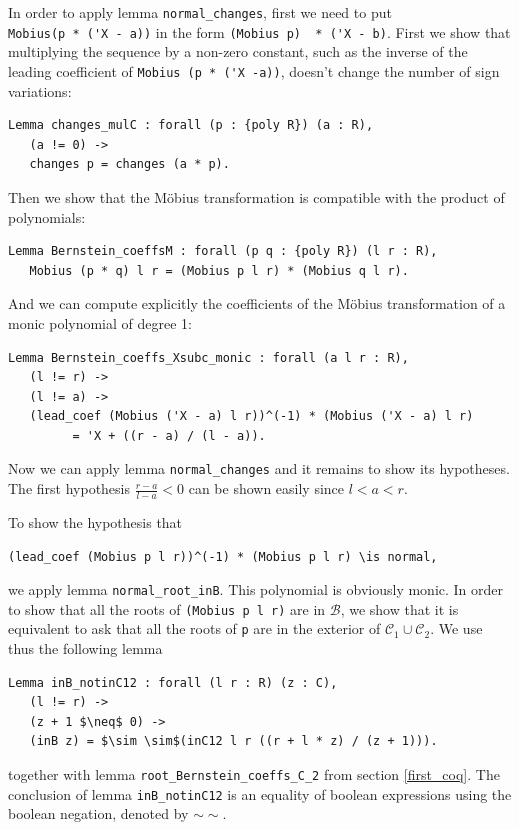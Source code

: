 \documentclass[11pt, a4paper]{article}
\newcommand{\ssb}{{\mathcal B}}
\newcommand{\ssc}{{\mathcal C}}
\begin{document}
In order to apply lemma \lstinline!normal_changes!, first we need to put\\ \lstinline!Mobius(p * ('X - a))! in the form \lstinline!(Mobius p)  * ('X - b)!.
First we show that multiplying the sequence by a non-zero constant, such as the inverse of the leading coefficient of \lstinline!Mobius (p * ('X -a))!, doesn't change the number of sign variations:
\begin{lstlisting}
Lemma changes_mulC : forall (p : {poly R}) (a : R),
   (a != 0) ->
   changes p = changes (a * p).
\end{lstlisting}
Then we show that the M\"obius transformation is compatible with the product of polynomials:
\begin{lstlisting}
Lemma Bernstein_coeffsM : forall (p q : {poly R}) (l r : R),
   Mobius (p * q) l r = (Mobius p l r) * (Mobius q l r).
\end{lstlisting}
And we can compute explicitly the coefficients of the M\"obius transformation of a monic polynomial of degree 1:
\begin{lstlisting}
Lemma Bernstein_coeffs_Xsubc_monic : forall (a l r : R),
   (l != r) ->
   (l != a) ->
   (lead_coef (Mobius ('X - a) l r))^(-1) * (Mobius ('X - a) l r) 
         = 'X + ((r - a) / (l - a)).
\end{lstlisting}
Now we can apply lemma \lstinline!normal_changes! and it remains to show its hypotheses.
The first hypothesis $\frac{r-a}{l-a} < 0$ can be shown easily since $l < a <r$.

To show the hypothesis that 
\begin{lstlisting}
(lead_coef (Mobius p l r))^(-1) * (Mobius p l r) \is normal,
\end{lstlisting}
 we apply lemma \lstinline!normal_root_inB!. This polynomial is obviously monic. In order to show that all the roots of \lstinline!(Mobius p l r)! are in $\ssb$, we show that it is equivalent to ask that all the roots of \lstinline!p! are in the exterior of $\ssc_1 \cup \ssc_2$. We use thus the following lemma
\begin{lstlisting}
Lemma inB_notinC12 : forall (l r : R) (z : C),
   (l != r) ->
   (z + 1 $\neq$ 0) ->
   (inB z) = $\sim \sim$(inC12 l r ((r + l * z) / (z + 1))).
\end{lstlisting}
together with lemma \lstinline!root_Bernstein_coeffs_C_2! from section \ref{first_coq}. The conclusion of lemma \lstinline!inB_notinC12! is an equality of boolean expressions using the boolean negation, denoted by $\sim\sim$.
\end{document}
